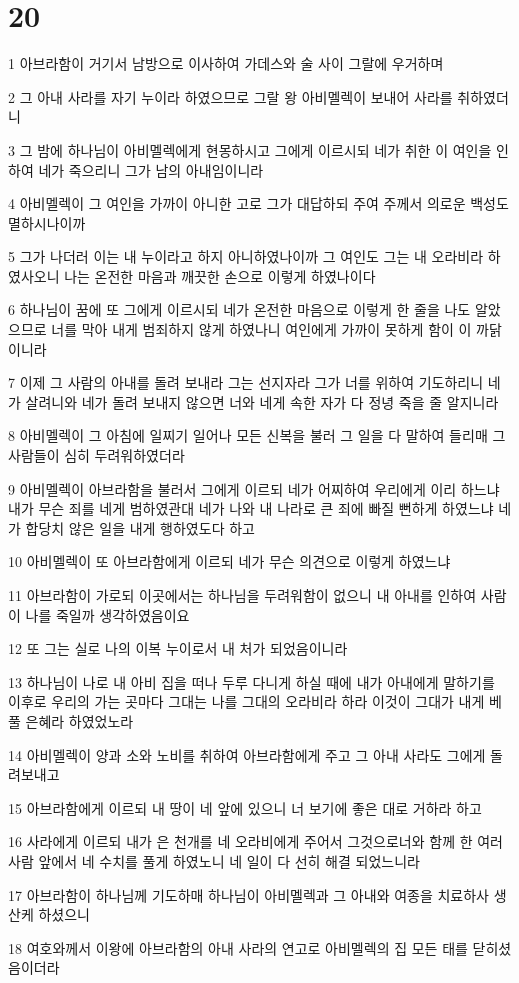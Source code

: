 \chapter{20}

\par 1 아브라함이 거기서 남방으로 이사하여 가데스와 술 사이 그랄에 우거하며
\par 2 그 아내 사라를 자기 누이라 하였으므로 그랄 왕 아비멜렉이 보내어 사라를 취하였더니
\par 3 그 밤에 하나님이 아비멜렉에게 현몽하시고 그에게 이르시되 네가 취한 이 여인을 인하여 네가 죽으리니 그가 남의 아내임이니라
\par 4 아비멜렉이 그 여인을 가까이 아니한 고로 그가 대답하되 주여 주께서 의로운 백성도 멸하시나이까
\par 5 그가 나더러 이는 내 누이라고 하지 아니하였나이까 그 여인도 그는 내 오라비라 하였사오니 나는 온전한 마음과 깨끗한 손으로 이렇게 하였나이다
\par 6 하나님이 꿈에 또 그에게 이르시되 네가 온전한 마음으로 이렇게 한 줄을 나도 알았으므로 너를 막아 내게 범죄하지 않게 하였나니 여인에게 가까이 못하게 함이 이 까닭이니라
\par 7 이제 그 사람의 아내를 돌려 보내라 그는 선지자라 그가 너를 위하여 기도하리니 네가 살려니와 네가 돌려 보내지 않으면 너와 네게 속한 자가 다 정녕 죽을 줄 알지니라
\par 8 아비멜렉이 그 아침에 일찌기 일어나 모든 신복을 불러 그 일을 다 말하여 들리매 그 사람들이 심히 두려워하였더라
\par 9 아비멜렉이 아브라함을 불러서 그에게 이르되 네가 어찌하여 우리에게 이리 하느냐 내가 무슨 죄를 네게 범하였관대 네가 나와 내 나라로 큰 죄에 빠질 뻔하게 하였느냐 네가 합당치 않은 일을 내게 행하였도다 하고
\par 10 아비멜렉이 또 아브라함에게 이르되 네가 무슨 의견으로 이렇게 하였느냐
\par 11 아브라함이 가로되 이곳에서는 하나님을 두려워함이 없으니 내 아내를 인하여 사람이 나를 죽일까 생각하였음이요
\par 12 또 그는 실로 나의 이복 누이로서 내 처가 되었음이니라
\par 13 하나님이 나로 내 아비 집을 떠나 두루 다니게 하실 때에 내가 아내에게 말하기를 이후로 우리의 가는 곳마다 그대는 나를 그대의 오라비라 하라 이것이 그대가 내게 베풀 은혜라 하였었노라
\par 14 아비멜렉이 양과 소와 노비를 취하여 아브라함에게 주고 그 아내 사라도 그에게 돌려보내고
\par 15 아브라함에게 이르되 내 땅이 네 앞에 있으니 너 보기에 좋은 대로 거하라 하고
\par 16 사라에게 이르되 내가 은 천개를 네 오라비에게 주어서 그것으로너와 함께 한 여러사람 앞에서 네 수치를 풀게 하였노니 네 일이 다 선히 해결 되었느니라
\par 17 아브라함이 하나님께 기도하매 하나님이 아비멜렉과 그 아내와 여종을 치료하사 생산케 하셨으니
\par 18 여호와께서 이왕에 아브라함의 아내 사라의 연고로 아비멜렉의 집 모든 태를 닫히셨음이더라

